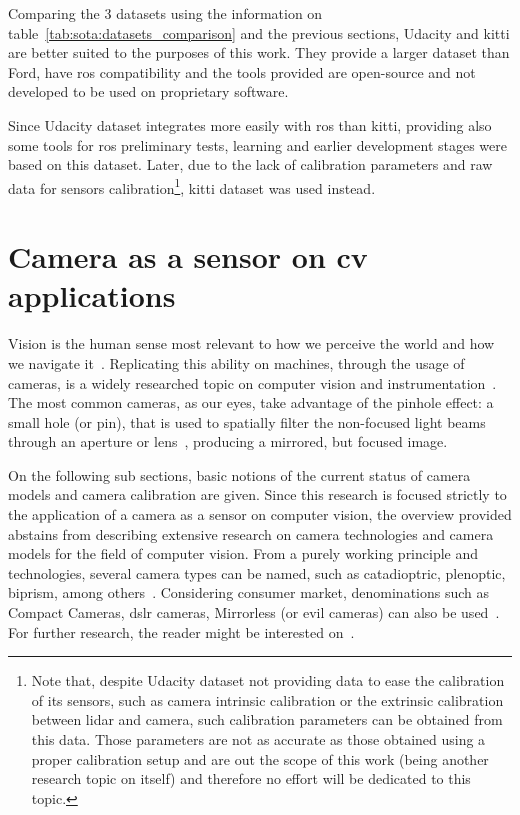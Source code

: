 
Comparing the 3 datasets using the information on table~\ref{tab:sota:datasets_comparison} and the previous sections, Udacity and \ac{kitti} are better suited to the purposes of this work. They provide a larger dataset than Ford, have \ac{ros} compatibility and the tools provided are open-source and not developed to be used on proprietary software.

Since Udacity dataset integrates more easily with \ac{ros} than \ac{kitti}, providing also some tools for \ac{ros} preliminary tests, learning and earlier development stages were based on this dataset. Later, due to the lack of calibration parameters and raw data for sensors calibration\footnote{Note that, despite Udacity dataset not providing data to ease the calibration of its sensors, such as camera intrinsic calibration or the extrinsic calibration between \ac{lidar} and camera, such calibration parameters can be obtained from this data. Those parameters are not as accurate as those obtained using a proper calibration setup and are out the scope of this work (being another research topic on itself) and therefore no effort will be dedicated to this topic.}, \ac{kitti} dataset was used instead.



\section{Camera as a sensor on \acl{cv} applications}
\label{sec:sota:camera}
Vision is the human sense most relevant to how we perceive the world and how we navigate it~\cite{Ekstrom2015, Beck1983}. Replicating this ability on machines, through the usage of cameras, is a widely researched topic on computer vision and instrumentation~\cite{Beck1983}. The most common cameras, as our eyes, take advantage of the pinhole effect: a small hole (or pin), that is used to spatially filter the non-focused light beams through an aperture or lens~\cite{Beck1983, camera_models, Sturm2010}, producing a mirrored, but focused image.

On the following sub sections, basic notions of the current status of camera models and camera calibration are given. Since this research is focused strictly to the application of a camera as a sensor on computer vision, the overview provided abstains from describing extensive research on camera technologies and camera models for the field of computer vision. From a purely working principle and technologies, several camera types can be named, such as catadioptric, plenoptic, biprism, among others~\cite{Sturm2010}. Considering consumer market, denominations such as Compact Cameras, \ac{dslr} cameras, Mirrorless (or \ac{evil} cameras) can also be used~\cite{comercial_cameras}. For further research, the reader might be interested on~\cite{comercial_cameras, Sturm2010, camera_models, Merklinger1993, Photopillers}.


